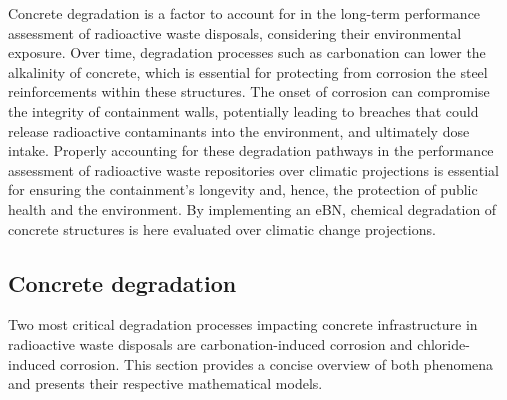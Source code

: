 
Concrete degradation is a factor to account for in the long-term performance assessment of radioactive waste disposals, considering their environmental exposure. Over time, degradation processes such as carbonation can lower the alkalinity of concrete, which is essential for protecting from corrosion the steel reinforcements within these structures.
The onset of corrosion can compromise the integrity of containment walls, potentially leading to breaches that could release radioactive contaminants into the environment, and ultimately dose intake.
Properly accounting for these degradation pathways in the performance assessment of radioactive waste repositories over climatic projections is essential for ensuring the containment's longevity and, hence, the protection of public health and the environment. By implementing an eBN, chemical degradation of concrete structures is here evaluated over climatic change projections. 

\subsection{Concrete degradation}
Two most critical degradation processes impacting concrete infrastructure in radioactive waste disposals are carbonation-induced corrosion and chloride-induced corrosion. This section provides a concise overview of both phenomena and presents their respective mathematical models.

